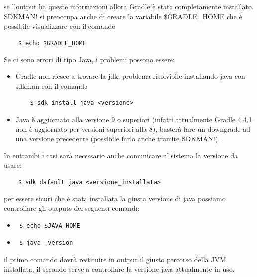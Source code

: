 se l'output ha queste informazioni allora Gradle è stato completamente installato. SDKMAN! si preoccupa anche di creare la variabile \$GRADLE\_HOME che è possibile visualizzare con il comando 
\begin{verbatim} 
    $ echo $GRADLE_HOME \end{verbatim} 
Se ci sono errori di tipo Java, i problemi possono essere:
\begin{itemize}
  \item Gradle non riesce a trovare la jdk, problema risolvibile installando java con sdkman con il comando 
  \begin{verbatim}
    $ sdk install java <versione>  \end{verbatim}
  \item Java è aggiornato alla versione 9 o superiori (infatti attualmente Gradle 4.4.1 non è aggiornato per versioni superiori alla 8), basterà fare un downgrade ad una versione precedente (possibile farlo anche tramite SDKMAN!).
\end{itemize}
In entrambi i casi sarà necessario anche comunicare al sistema la versione da usare: 
\begin{verbatim}  
    $ sdk dafault java <versione_installata> \end{verbatim} 
per essere sicuri che è stata installata la giusta versione di java possiamo controllare gli outputs dei seguenti comandi:
\begin{itemize}
  \item \begin{verbatim} $ echo $JAVA_HOME \end{verbatim}
  \item \begin{verbatim} $ java -version \end{verbatim}
\end{itemize}
il primo comando dovrà restituire in output il giusto percorso della JVM installata, il secondo serve a controllare la versione java attualmente in uso.


